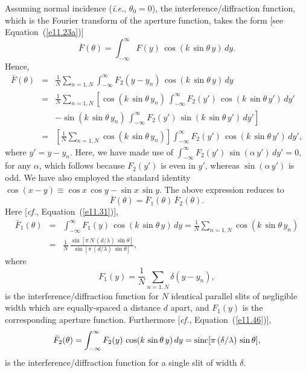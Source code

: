 Assuming normal incidence ({\em i.e.}, $\theta_0=0$), the interference/diffraction function, which is the Fourier transform
of the aperture function, takes the form [see Equation~(\ref{e11.23a})]
\begin{equation}
\bar{F}(\theta) = \int_{-\infty}^{\infty} F(y)\,\cos(k\,\sin\theta\,y)\,dy.
\end{equation}
Hence, 
\begin{eqnarray}
\bar{F}(\theta) &=& \frac{1}{N}\sum_{n=1,N}\int_{-\infty}^\infty F_2(y-y_n)\,\cos(k\,\sin\theta\,y)\,dy\nonumber\\[0.5ex]
&=&\frac{1}{N}\sum_{n=1,N} \left[\cos(k\,\sin\theta\,y_n)\,\int_{-\infty}^\infty F_2(y')\,\cos(k\,\sin\theta\,y')\,dy'\right.\nonumber\\[0.5ex]
&&\left.
- \sin(k\,\sin\theta\,y_n)\,\int_{-\infty}^\infty F_2(y')\,\sin(k\,\sin\theta\,y')\,dy'\right]\nonumber\\[0.5ex]
&=&\left[\frac{1}{N}\sum_{n=1,N} \cos(k\,\sin\theta\,y_n)\right] \int_{-\infty}^\infty F_2(y')\,\cos(k\,\sin\theta\,y')\,dy',
\end{eqnarray}
where $y'=y-y_n$. Here, we have made use of  $\int_{-\infty}^\infty  F_2(y')\,\sin(\alpha\,y')\,dy'=0$, for any $\alpha$,
which follows because $F_2(y')$ is even in $y'$, whereas $\sin(\alpha\,y')$ is odd. 
We have also employed the standard identity $\cos(x-y)\equiv \cos x\,\cos y-\sin x\,\sin y$. 
The above expression reduces to
\begin{equation}
\bar{F}(\theta) = \bar{F}_1(\theta)\,\bar{F}_2(\theta).
\end{equation}
Here [{\em cf.}, Equation~(\ref{e11.31})],
\begin{eqnarray}
\bar{F}_1(\theta)&=& \int_{-\infty}^\infty F_1(y)\,\cos(k\,\sin\theta\,y)\,dy=\frac{1}{N}\sum_{n=1,N}\cos(k\,\sin\theta\,y_n)\nonumber\\[0.5ex]
&=&\frac{1}{N}\,\frac{\sin[\pi\,N\,(d/\lambda)\,\sin\theta]}{\sin [\pi\,(d/\lambda)\,\sin\theta]},
\end{eqnarray}
where
\begin{equation}
F_1(y) = \frac{1}{N} \sum_{n=1,N} \delta(y-y_n),
\end{equation}
is the interference/diffraction function  for $N$ identical parallel slits of negligible width which are equally-spaced a distance $d$
apart, and $F_1(y)$ is the corresponding aperture function.
Furthermore [{\em cf.}, Equation~(\ref{e11.46})], 
\begin{equation}
\bar{F}_2(\theta) = \int_{-\infty}^\infty F_2(y)\,\cos(k\,\sin\theta\,y)\,dy = {\rm sinc}[\pi\,(\delta/\lambda)\,\sin\theta],
\end{equation}
is the interference/diffraction function for a single slit of width $\delta$. 

